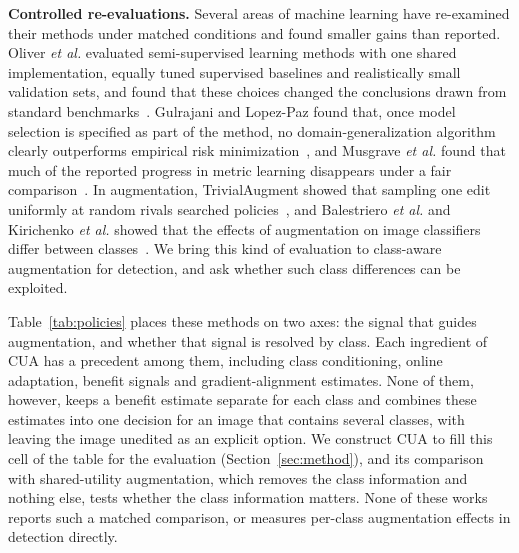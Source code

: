 \documentclass[conference]{IEEEtran}
\begin{document}
\noindent\textbf{Controlled re-evaluations.} Several areas of machine learning have re-examined their methods under matched conditions and found smaller gains than reported. Oliver \emph{et al.} evaluated semi-supervised learning methods with one shared implementation, equally tuned supervised baselines and realistically small validation sets, and found that these choices changed the conclusions drawn from standard benchmarks~\cite{oliver2018realistic}. Gulrajani and Lopez-Paz found that, once model selection is specified as part of the method, no domain-generalization algorithm clearly outperforms empirical risk minimization~\cite{gulrajani2021search}, and Musgrave \emph{et al.} found that much of the reported progress in metric learning disappears under a fair comparison~\cite{musgrave2020metric}. In augmentation, TrivialAugment showed that sampling one edit uniformly at random rivals searched policies~\cite{muller2021trivial}, and Balestriero \emph{et al.} and Kirichenko \emph{et al.} showed that the effects of augmentation on image classifiers differ between classes~\cite{balestriero2022effects,kirichenko2023}. We bring this kind of evaluation to class-aware augmentation for detection, and ask whether such class differences can be exploited.

Table~\ref{tab:policies} places these methods on two axes: the signal that guides augmentation, and whether that signal is resolved by class. Each ingredient of CUA has a precedent among them, including class conditioning, online adaptation, benefit signals and gradient-alignment estimates. None of them, however, keeps a benefit estimate separate for each class and combines these estimates into one decision for an image that contains several classes, with leaving the image unedited as an explicit option. We construct CUA to fill this cell of the table for the evaluation (Section~\ref{sec:method}), and its comparison with shared-utility augmentation, which removes the class information and nothing else, tests whether the class information matters. None of these works reports such a matched comparison, or measures per-class augmentation effects in detection directly.
\end{document}
